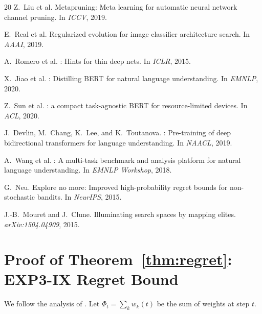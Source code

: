 \documentclass{article}
\begin{document}
\begin{thebibliography}{20}
Z.~Liu et al.
\newblock Metapruning: Meta learning for automatic neural network channel
  pruning.
\newblock In \emph{ICCV}, 2019.

E.~Real et al.
\newblock Regularized evolution for image classifier architecture search.
\newblock In \emph{AAAI}, 2019.

A.~Romero et al.
: Hints for thin deep nets.
\newblock In \emph{ICLR}, 2015.

X.~Jiao et al.
: Distilling {BERT} for natural language understanding.
\newblock In \emph{EMNLP}, 2020.

Z.~Sun et al.
: a compact task-agnostic {BERT} for resource-limited
  devices.
\newblock In \emph{ACL}, 2020.

J.~Devlin, M.~Chang, K.~Lee, and K.~Toutanova.
: Pre-training of deep bidirectional transformers for language
  understanding.
\newblock In \emph{NAACL}, 2019.

A.~Wang et al.
: A multi-task benchmark and analysis platform for natural
  language understanding.
\newblock In \emph{EMNLP Workshop}, 2018.

G.~Neu.
\newblock Explore no more: Improved high-probability regret bounds for
  non-stochastic bandits.
\newblock In \emph{NeurIPS}, 2015.

J.-B.~Mouret and J.~Clune.
\newblock Illuminating search spaces by mapping elites.
\newblock \emph{arXiv:1504.04909}, 2015.
\end{thebibliography}

\appendix

\section{Proof of Theorem~\ref{thm:regret}: EXP3-IX Regret Bound}
\label{app:regret}

We follow the analysis of \citet{neu2015explore}.  Let $\Phi_t =
\sum_k w_k(t)$ be the sum of weights at step $t$.
\end{document}
